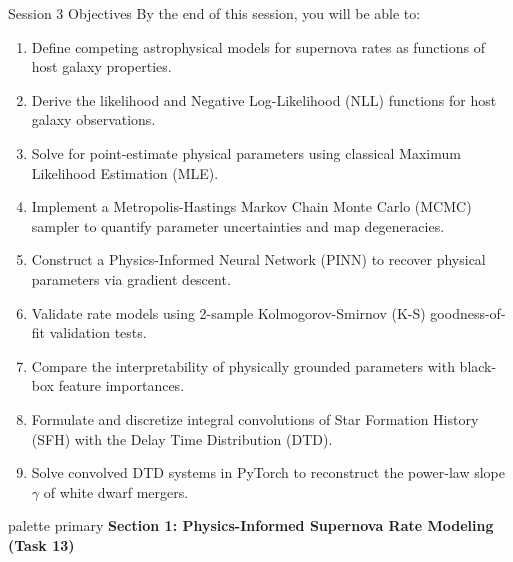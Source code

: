 \documentclass[9pt]{beamer}
\begin{document}
\begin{frame}{Session 3 Objectives}
  By the end of this session, you will be able to:
  \begin{enumerate}
    \item Define competing astrophysical models for supernova rates as functions of host galaxy properties.
    \item Derive the likelihood and Negative Log-Likelihood (NLL) functions for host galaxy observations.
    \item Solve for point-estimate physical parameters using classical Maximum Likelihood Estimation (MLE).
    \item Implement a Metropolis-Hastings Markov Chain Monte Carlo (MCMC) sampler to quantify parameter uncertainties and map degeneracies.
    \item Construct a Physics-Informed Neural Network (PINN) to recover physical parameters via gradient descent.
    \item Validate rate models using 2-sample Kolmogorov-Smirnov (K-S) goodness-of-fit validation tests.
    \item Compare the interpretability of physically grounded parameters with black-box feature importances.
    \item Formulate and discretize integral convolutions of Star Formation History (SFH) with the Delay Time Distribution (DTD).
    \item Solve convolved DTD systems in PyTorch to reconstruct the power-law slope $\gamma$ of white dwarf mergers.
  \end{enumerate}
\end{frame}

\begin{frame}[plain]
  \vfill
  \centering
  \begin{beamercolorbox}[sep=8pt,center,shadow=true,rounded=true]{palette primary}
    \textbf{Section 1: Physics-Informed Supernova Rate Modeling (Task 13)}
  \end{beamercolorbox}
  \vfill
\end{frame}
\end{document}
